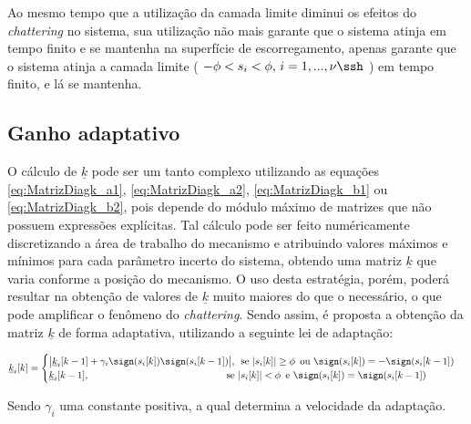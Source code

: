 \documentclass[]{politex}
\begin{document}
Ao mesmo tempo que a utilização da camada limite diminui os efeitos do \emph{chattering} no sistema, sua utilização não mais garante que o sistema atinja em tempo finito e se mantenha na superfície de escorregamento, apenas garante que o sistema atinja a camada limite ( $-\phi < s_i < \phi, \, i = 1,...,\nu\ssh $ ) em tempo finito, e lá se mantenha. 


\subsection{Ganho adaptativo}

O cálculo de $\underline{k}$ pode ser um tanto complexo utilizando as equações \eqref{eq:MatrizDiagk_a1}, \eqref{eq:MatrizDiagk_a2}, \eqref{eq:MatrizDiagk_b1} ou \eqref{eq:MatrizDiagk_b2}, pois depende do módulo máximo de matrizes que não possuem expressões explícitas. Tal cálculo pode ser feito numéricamente discretizando a área de trabalho do mecanismo e atribuindo valores máximos e mínimos para cada parâmetro incerto do sistema, obtendo uma matriz $\underline{k}$ que varia conforme a posição do mecanismo. O uso desta estratégia, porém, poderá resultar na obtenção de valores de $\underline{k}$ muito maiores do que o necessário, o que pode amplificar o fenômeno do \emph{chattering}. Sendo assim, é proposta a obtenção da matriz $\underline{k}$ de forma adaptativa, utilizando a seguinte lei de adaptação:

\begin{equation}
\underline{k}_i[k] = \begin{cases}
\big| \underline{k}_i[k-1] + \gamma_i \sign(s_i [k]) \sign(s_i [k-1])  \big|, \, \text{ se } |s_i[k]| \geq \phi \, \text{ ou }  \sign(s_i [k]) = - \sign(s_i [k-1]) \\
\underline{k}_i[k-1], \;\;\;\;\;\;\;\;\;\;\;\;\;\;\;\;\;\;\;\;\;\;\;\;\;\;\;\;\;\;\;\;\;\;\;\;\;\;\;\;\;\;\;\;\;\;\;\;\;\, \text{ se } |s_i[k]| < \phi \, \text{ e }  \sign(s_i [k]) = \sign(s_i [k-1]) \\
 
\end{cases}
\end{equation}

Sendo $\gamma_i$ uma constante positiva, a qual determina a velocidade da adaptação. \\
\end{document}
